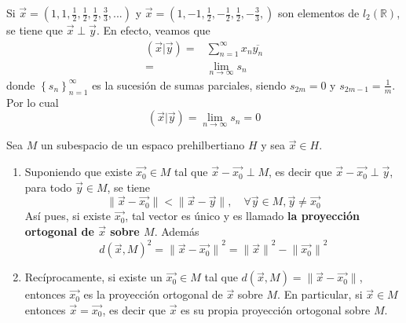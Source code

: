 \documentclass[12pt]{report}
\newcounter{it}
\theoremstyle{largebreak}
\newcommand\norm[1]{\ensuremath{\|#1\|}}
\newcommand\pint[2]{\ensuremath{\left(#1\big| #2\right)}}
\newcommand\conj[1]{\ensuremath{\overline{#1}}}
\begin{document}
    \begin{exa}
        Si $\vec{x}=(1,1,\frac{1}{2},\frac{1}{2},\frac{1}{2},\frac{3}{3},...)$ y $\vec{x}=(1,-1,\frac{1}{2},-\frac{1}{2},\frac{1}{2},-\frac{3}{3},)$ son elementos de $l_2(\mathbb{R})$, se tiene que $\vec{x}\perp\vec{y}$. En efecto, veamos que
        \begin{equation*}
            \begin{split}
                \pint{\vec{x}}{\vec{y}}=&\sum_{n=1}^{\infty}x_n\conj{y_n}\\
                =&\lim_{n\rightarrow\infty}s_n
            \end{split}
        \end{equation*}
        donde $\left\{s_n\right\}_{n=1}^\infty$ es la sucesión de sumas parciales, siendo $s_{2m}=0$ y $s_{2m-1}=\frac{1}{m}$. Por lo cual
        \begin{equation*}
            \pint{\vec{x}}{\vec{y}}=\lim_{n\rightarrow\infty}s_n=0
        \end{equation*}
    \end{exa}

    \begin{theor}
        Sea $M$ un subespacio de un espaco prehilbertiano $H$ y sea $\vec{x}\in H$.
        \begin{enumerate}
            \item Suponiendo que existe $\vec{x_0}\in M$ tal que $\vec{x}-\vec{x_0}\perp M$, es decir que $\vec{x}-\vec{x_0}\perp\vec{y}$, para todo $\vec{y}\in M$, se tiene
            \begin{equation*}
                \norm{\vec{x}-\vec{x_0}}<\norm{\vec{x}-\vec{y}},\quad\forall\vec{y}\in M,\vec{y}\neq\vec{x_0}
            \end{equation*}
            Así pues, si existe $\vec{x_0}$, tal vector es único y es llamado \textbf{la proyección ortogonal de $\vec{x}$ sobre $M$}. Además
            \begin{equation*}
                d(\vec{x},M)^2=\norm{\vec{x}-\vec{x_0}}^2=\norm{\vec{x}}^2-\norm{\vec{x_0}}^2
            \end{equation*}
            \item Recíprocamente, si existe un $\vec{x_0}\in M$ tal que $d(\vec{x},M)=\norm{\vec{x}-\vec{x_0}}$, entonces $\vec{x_0}$ es la proyección ortogonal de $\vec{x}$ sobre $M$. En particular, si $\vec{x}\in M$ entonces $\vec{x}=\vec{x_0}$, es decir que $\vec{x}$ es su propia proyección ortogonal sobre $M$.
        \end{enumerate}
    \end{theor}
\end{document}
